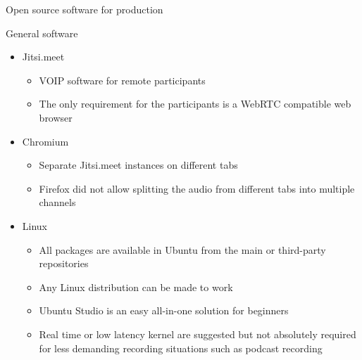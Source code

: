 \begin{frame}{Open source software for production}

    General software
    \begin{itemize}
        \item Jitsi.meet
        \begin{itemize}
            \item VOIP software for remote participants
            \item The only requirement for the participants is a WebRTC compatible web browser
        \end{itemize}
        \item Chromium
        \begin{itemize}
            \item Separate Jitsi.meet instances on different tabs
            \item Firefox did not allow splitting the audio from different tabs into multiple channels 
        \end{itemize}
        \item Linux
        \begin{itemize}
            \item All packages are available in Ubuntu from the main or third-party repositories
            \item Any Linux distribution can be made to work
            \item Ubuntu Studio is an easy all-in-one solution for beginners
            \item Real time or low latency kernel are suggested but not absolutely required for less demanding recording situations such as podcast recording
        \end{itemize}
    \end{itemize}

\end{frame}

